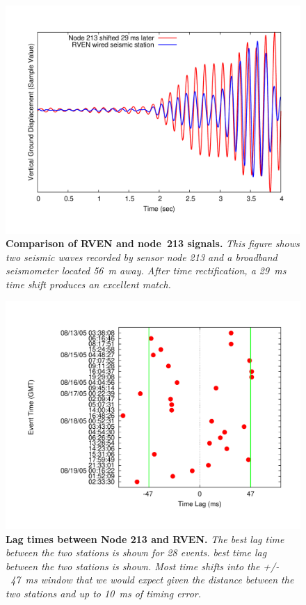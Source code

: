 \begin{figure}[t]
\begin{center}
\includegraphics[width=\hsize]{./5-evaluation/figs/timing/RV213/2005-08-15_09.11.28/213VREFTEK-NEGATIVE29MS-OFFSET.pdf}
\end{center}
\caption{\small {\bf Comparison of RVEN and node~213 signals.} 
{\em This figure shows two seismic waves recorded by sensor node 213 and a
broadband seismometer located 56~m away. After time rectification, a 29~ms
time shift produces an excellent match.}}
\label{fig-rvenv213}
\end{figure}

\begin{figure}[t]
\begin{center}
\includegraphics[width=\hsize]{./5-evaluation/figs/timing/RV213/Table/213-GOODDIFFS2.pdf}
\end{center}
\caption{\small{\bf Lag times between Node 213 and RVEN.}
{\em The best lag time between the two stations is shown for 28 events.  best
time lag between the two stations is shown.  Most time shifts into the
+/-~47~ms window that we would expect given the distance between the two
stations and up to 10~ms of timing error.}}
\label{fig-rvenv213all}
\end{figure}

